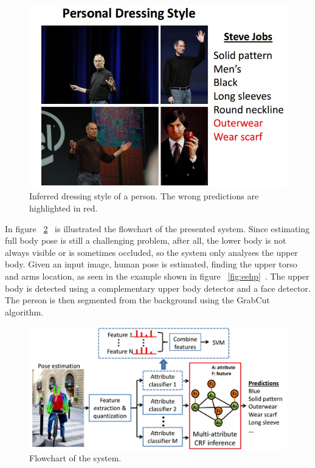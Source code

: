 \documentclass[titlepage,12pt,a4paper,times]{book}
\begin{document}
\begin{figure}[!h]
\centering
\includegraphics[scale=0.7]{images/2_3_fig0.jpg}
\caption{Inferred dressing style of a person. The wrong predictions are
highlighted in red.}
\label{fig:ids}
\end{figure}
\FloatBarrier

In figure ~\ref{fig:fc}~\citep{2} is illustrated the flowchart of the presented
system. Since estimating full body pose is still a challenging problem, after
all, the lower body is not always visible or is sometimes occluded, so the
system only analyses the upper body. Given an input image, human pose is
estimated, finding the upper torso and arms location, as seen in the example
shown in figure ~\ref{fig:eehp}~\citep{2}. The upper body is detected using a
complementary upper body detector and a face detector. The person is then
segmented from the background using the GrabCut~\citep{7} algorithm.

\begin{figure}[!h]
\centering
\includegraphics[scale=0.5]{images/2_3_fig2.jpg}
\caption{Flowchart of the system.}
\label{fig:fc}
\end{figure}
\FloatBarrier
\end{document}

